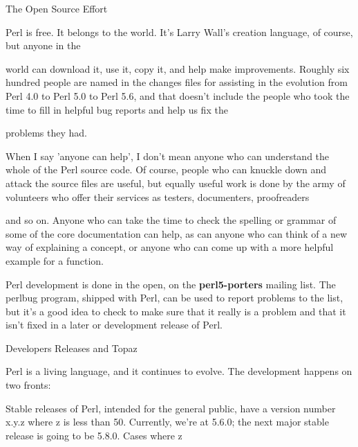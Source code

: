 \documentclass[a4paper,11pt]{book}
\begin{document}
\noindent 

\noindent The Open Source Effort

\noindent 

\noindent Perl is free.  It  belongs  to  the  world.  It's  Larry Wall's creation  language,  of  course,  but  anyone  in  the

\noindent world  can  download it,  use  it,  copy  it,  and  help  make  improvements.  Roughly  six  hundred  people  are named in the  changes files for  assisting in the evolution  from  Perl  4.0 to  Perl  5.0 to  Perl  5.6,  and  that doesn't  include the people who  took  the  time  to  fill  in  helpful  bug  reports  and  help  us  fix  the

\noindent problems they had.

\noindent 

\noindent When I say 'anyone can help', I don't mean anyone who can understand the whole of the Perl source code. Of course, people who can knuckle down and attack the source files are useful, but equally useful work is done by the army of volunteers who offer their services as testers, documenters, proofreaders

\noindent and so on. Anyone who can take the time to check the spelling or grammar of some of the core documentation can help, as can anyone who can think of a new way of explaining a concept, or anyone who can come up with a more helpful example for a function.

\noindent 

\noindent Perl development  is done  in the  open,  on  the  \textbf{perl5-porters  }mailing  list.  The perlbug program, shipped with Perl,  can be used  to  report  problems  to  the  list,  but it's  a  good idea  to  check  to make sure that it really is a problem and that it isn't fixed in a later or development release of Perl.

\noindent 

\noindent Developers Releases and Topaz

\noindent 

\noindent Perl is a living language, and it continues to evolve. The development happens on two fronts:

\noindent 

\noindent Stable releases of Perl,  intended  for the  general  public,  have  a  version  number  x.y.z  where  z  is  less than 50.  Currently,  we're at  5.6.0;  the  next  major  stable  release  is  going  to  be  5.8.0.  Cases  where  z
\end{document}
